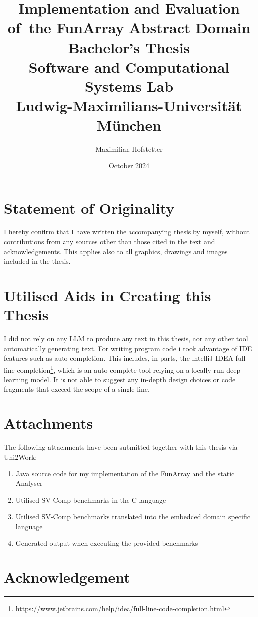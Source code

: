 \documentclass{report}
\title{\Huge{}Implementation and Evaluation of~the FunArray Abstract Domain\\[1em]\large{}Bachelor's Thesis\\[1em]Software and Computational Systems Lab\\Ludwig-Maximilians-Universit\"at M\"unchen}
\date{October 2024}
\author{Maximilian Hofstetter}
\begin{document}
\maketitle

\section*{Statement of Originality}
\thispagestyle{empty}
I hereby confirm that I have written the accompanying thesis by myself, without contributions from any sources other than those cited in the text and acknowledgements. This applies also to all graphics, drawings and images included in the thesis.

\section*{Utilised Aids in Creating this Thesis}

I did not rely on any LLM to produce any text in this thesis, nor any other tool automatically generating text. For writing program code i took advantage of IDE features such as auto-completion. This includes, in parts, the IntelliJ IDEA full line completion\footnote{\url{https://www.jetbrains.com/help/idea/full-line-code-completion.html}}, which is an auto-complete tool relying on a locally run deep learning model. It is not able to suggest any in-depth design choices or code fragments that exceed the scope of a single line.

\section*{Attachments}

The following attachments have been submitted together with this thesis via Uni2Work:

\begin{enumerate}
	\item Java source code for my implementation of the FunArray and the static Analyser
	\item Utilised SV-Comp benchmarks in the C language
	\item Utilised SV-Comp benchmarks translated into the embedded domain specific language
	\item Generated output when executing the provided benchmarks
\end{enumerate}

\section*{Acknowledgement}
\end{document}
